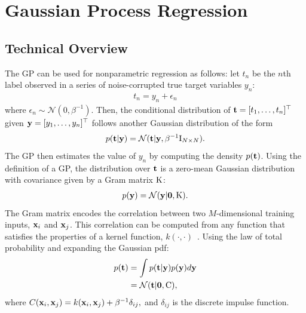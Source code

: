\section{Gaussian Process Regression}
\label{sec:overviewofgaussianprocessregression}

\subsection{Technical Overview}
\label{sub:technicaloverview}

The \ac{GP} can be used for nonparametric regression as follows: let $t_n$ be
the $n$th label observed in a series of noise-corrupted true target
variables $y_n$:
\begin{align*}
  t_n = y_n + \epsilon_n
\end{align*}
where $\epsilon_n \sim \mathcal{N}(0, \beta^{-1})$.  Then, the conditional distribution of
${\bf t} = [t_1, \dots, t_n]^\top$ given ${\bf y} =  [y_1, \dots, y_n]^\top$ follows
another Gaussian distribution of the form
\begin{align*}
  p ({\bf t} | {\bf y}) = \mathcal{N}({\bf t}| {\bf y}, \beta^{-1} \mathrm{I}_{N \times N}).
\end{align*}
The \ac{GP} then estimates the value of $y_n$ by computing the density $p({\bf t})$.
Using the definition of a \ac{GP}, the distribution over ${\bf t}$ is a zero-mean Gaussian
distribution with covariance given by a Gram matrix $\mathrm{K}$:
\begin{align*}
  p ({\bf y}) = \mathcal{N} ({\bf y}| {\bf 0}, \mathrm{K}).
\end{align*}
The Gram matrix encodes the correlation between two $M$-dimensional training inputs, ${\bf
  x}_i$ and ${\bf x}_j$.  This correlation can be computed from any function that
satisfies the properties of a kernel function, $k(\cdot,
\cdot)$~\cite{aizerman1964theoretical}.  Using the law of total probability and expanding
the Gaussian pdf:
\begin{align}
  \label{eqn:cov}
  p({\bf t}) &= \int p({\bf t} | {\bf y}) p({\bf y}) d {\bf y} \notag \\
  &= \mathcal{N}({\bf t}|{\bf 0}, \mathrm{C}),
\end{align}
where $C({\bf x}_i, {\bf x}_j) = k({\bf x}_i, {\bf x}_j) + \beta^{-1} \delta_{ij},$ and
$\delta_{ij}$ is the discrete impulse function.

